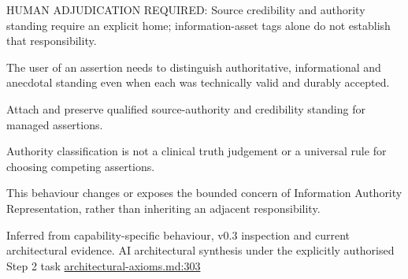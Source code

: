 HUMAN ADJUDICATION REQUIRED: Source credibility and authority standing require an explicit home; information-asset tags alone do not establish that responsibility.



The user of an assertion needs to distinguish authoritative, informational and anecdotal standing even when each was technically valid and durably accepted.



Attach and preserve qualified source-authority and credibility standing for managed assertions.



Authority classification is not a clinical truth judgement or a universal rule for choosing competing assertions.



This behaviour changes or exposes the bounded concern of Information Authority Representation, rather than inheriting an adjacent responsibility.


Inferred from capability-specific behaviour, v0.3 inspection and current architectural evidence. AI architectural synthesis under the explicitly authorised Step 2 task \hyperref[evidence:27549d51551beae6]{architectural-axioms.md:303}
